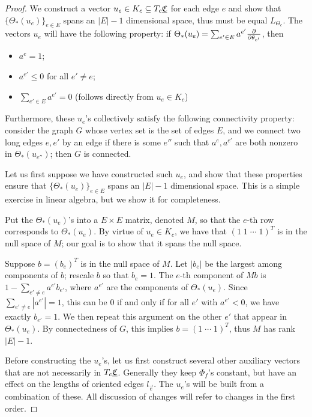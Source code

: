 \begin{proof}
We construct a vector $u_e \in K_c \subseteq T_c {\underline{\mathfrak{C}}}$ for each edge $e$
and show that $\{\Theta_*(u_e)\}_{e\in E}$ spans an
$|E|-1$ dimensional space,
thus must be equal $L_{\Theta_c}$.
The vectors $u_e$ will have the following property:
if $\Theta_*(u_e) = \sum_{e' \in E} a^{e'} {\frac{\partial}{\partial \theta_{e'}}}$, then
\begin{itemize}
	\item $a^e = 1$;
	\item $a^{e'} \leq 0$ for all $e' \neq e$;
	\item $\sum_{e' \in E} a^{e'} = 0$ (follows directly from $u_e \in K_c$)
\end{itemize}

Furthermore, these $u_e$'s collectively satisfy the following
connectivity property:
consider the graph $G$ whose vertex set is the set of edges $E$,
and we connect two long edges $e,e'$ by an edge if there is some $e''$ such that
$a^e, a^{e'}$ are both nonzero in $\Theta_*(u_{e''})$;
then $G$ is connected.


Let us first suppose we have constructed such $u_e$,
and show that these properties ensure that
$\{\Theta_*(u_e)\}_{e\in E}$ spans an $|E|-1$ dimensional space.
This is a simple exercise in linear algebra,
but we show it for completeness.


Put the $\Theta_*(u_e)$'s into a $E \times E$ matrix,
denoted $M$,
so that the $e$-th row corresponds to $\Theta_*(u_e)$.
By virtue of $u_e \in K_c$, we have that $(1\; 1\; \cdots \; 1)^T$
is in the null space of $M$;
our goal is to show that it spans the null space.


Suppose $b = (b_e)^T$ is in the null space of $M$.
Let $|b_e|$ be the largest among components of $b$;
rescale $b$ so that $b_e = 1$.
The $e$-th component of $M b$
is $1 - \sum_{e' \neq e} a^{e'} b_{e'}$,
where $a^{e'}$ are the components of $\Theta_*(u_e)$.
Since $\sum_{e' \neq e} |a^{e'}| = 1$, this can be 0 if and only if
for all $e'$ with $a^{e'} < 0$, we have exactly $b_{e'} = 1$.
We then repeat this argument on the other $e'$
that appear in $\Theta_*(u_e)$.
By connectedness of $G$, this implies
$b = (1 \; \cdots \; 1)^T$,
thus $M$ has rank $|E|-1$.


Before constructing the $u_e$'s,
let us first construct several other auxiliary vectors
that are not necessarily in $T_c {\underline{\mathfrak{C}}}$.
Generally they keep $\Phi_f$'s constant,
but have an effect on the lengths of oriented edges $l_{\vec{e}}$.
The $u_e$'s will be built from a combination of these.
All discussion of changes will refer to changes in the first order.



\end{proof}
